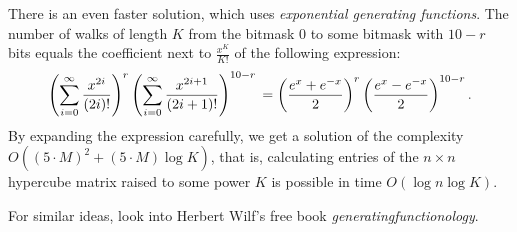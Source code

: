 There is an even faster solution, which uses \textit{exponential generating
functions}. The number of walks of length $K$ from the bitmask $0$ to some 
bitmask with $10-r$ bits equals the coefficient next to $\frac{x^K}{K!}$ of the
following expression:
\[
  \left(\sum_{i=0}^{\infty} \frac{x^{2i}}{(2i)!}\right)^{r}
  \left(\sum_{i=0}^{\infty} \frac{x^{2i+1}}{(2i+1)!}\right)^{10-r} \\
  = \left( \frac{e^x + e^{-x}}{2} \right)^{r}
  \left( \frac{e^x - e^{-x}}{2} \right)^{10-r}.
\]
By expanding the expression carefully, we get a solution of the complexity   
$O((5\cdot M)^2 + (5\cdot M) \log K)$, that is, calculating entries of the 
$n \times n$ hypercube matrix raised to some power $K$ 
is possible in time $O(\log n \log K)$. 

For similar ideas, look into Herbert Wilf's free book 
\textit{generatingfunctionology}.


